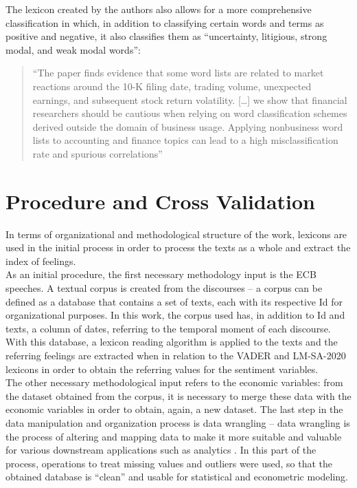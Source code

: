 The lexicon created by the authors also allows for a more comprehensive classification in which, in addition to classifying certain words and terms as positive and negative, it also classifies them as ``uncertainty, litigious, strong modal, and weak modal words''\citep[p.62]{loughran2011liability}: 
\begin{quote}
    ``The paper finds evidence that some word lists are related to market reactions around the 10-K filing date, trading volume, unexpected earnings, and subsequent stock return volatility. [\dots] we show that financial researchers should be cautious when relying on word classification schemes derived outside the domain of business usage. Applying nonbusiness word lists to accounting and finance topics can lead to a high misclassification rate and spurious correlations''\citep[p.62]{loughran2011liability}
\end{quote}

\section{Procedure and Cross Validation}

In terms of organizational and methodological structure of the work, lexicons are used in the initial process in order to process the texts as a whole and extract the index of feelings.\\

As an initial procedure, the first necessary methodology input is the ECB speeches. A textual corpus is created from the discourses -- a corpus can be defined as a database that contains a set of texts, each with its respective Id for organizational purposes. In this work, the corpus used has, in addition to Id and texts, a column of dates, referring to the temporal moment of each discourse. With this database, a lexicon reading algorithm is applied to the texts and the referring feelings are extracted when in relation to the VADER and LM-SA-2020 lexicons in order to obtain the referring values for the sentiment variables.\\

The other necessary methodological input refers to the economic variables: from the dataset obtained from the corpus, it is necessary to merge these data with the economic variables in order to obtain, again, a new dataset. The last step in the data manipulation and organization process is data wrangling -- data wrangling is the process of altering and mapping data to make it more suitable and valuable for various downstream applications such as analytics \cite[]{dplyr2022, wickham2016r}. In this part of the process, operations to treat missing values and outliers were used, so that the obtained database is ``clean'' and usable for statistical and econometric modeling.\\

